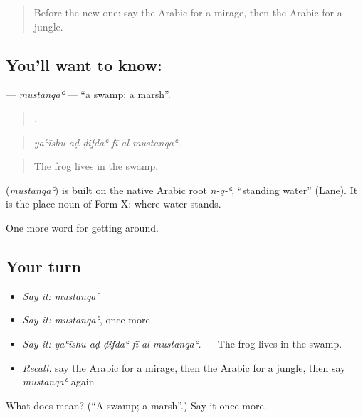 \begin{quote}
Before the new one: say the Arabic for a mirage, then the Arabic for a jungle.
\end{quote}

\subsection*{You'll want to know: }
\textbf{} — \emph{mustanqaʿ} — \textquotedblleft{}a swamp; a marsh\textquotedblright{}.

\begin{quote}
   .
\end{quote}

\begin{quote}
\emph{yaʿīshu aḍ-ḍifdaʿ fī al-mustanqaʿ.}
\end{quote}

\begin{quote}
The frog lives in the swamp.
\end{quote}

\begin{cousinweb}
\textbf{} (\emph{mustanqaʿ}) is built on the native Arabic root \emph{n-q-ʿ}, \textquotedblleft{}standing water\textquotedblright{} (Lane). It is the place-noun of Form X: where water stands.
\end{cousinweb}

\begin{grammarlens}[title={What you've built}]
One more word for getting around.
\end{grammarlens}

\subsection*{Your turn}
\begin{itemize}
\raggedright
  \item \emph{Say it:} \emph{mustanqaʿ}
  \item \emph{Say it:} \emph{mustanqaʿ}, once more
  \item \emph{Say it:} \emph{yaʿīshu aḍ-ḍifdaʿ fī al-mustanqaʿ.} — The frog lives in the swamp.
  \item \emph{Recall:} say the Arabic for a mirage, then the Arabic for a jungle, then say \emph{mustanqaʿ} again
\end{itemize}

\begin{tcolorbox}[breakable,colback=teal!4,colframe=teal!35!black,title={Before you move on}]
What does  mean? (\textquotedblleft{}A swamp; a marsh\textquotedblright{}.) Say it once more.
\end{tcolorbox}
